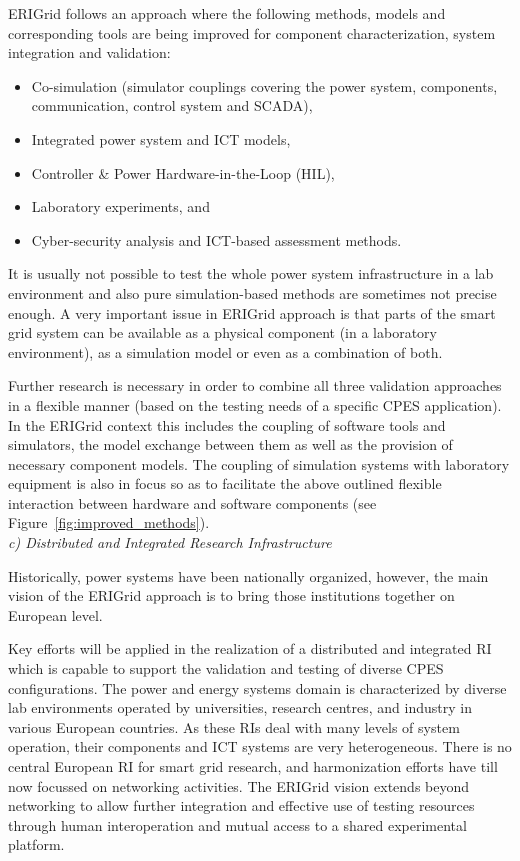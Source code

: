 \documentclass[runningheads,a4paper]{llncs}
\begin{document}
ERIGrid follows an approach where the following methods, models and corresponding tools are being improved for component characterization, system integration and validation:

\begin{itemize}
	\item Co-simulation (simulator couplings covering the power system, components, communication, control system and SCADA),
	\item Integrated power system and ICT models,
	\item Controller \& Power Hardware-in-the-Loop (HIL),
	\item Laboratory experiments, and
	\item Cyber-security analysis and ICT-based assessment methods.
\end{itemize}

It is usually not possible to test the whole power system infrastructure in a lab environment and also pure simulation-based methods are sometimes not precise enough. A very important issue in ERIGrid approach is that parts of the smart grid system can be available as a physical component (in a laboratory environment), as a simulation model or even as a combination of both. 

Further research is necessary in order to combine all three validation approaches in a flexible manner (based on the testing needs of a specific CPES application). In the ERIGrid context this includes the coupling of software tools and simulators, the model exchange between them as well as the provision of necessary component models. The coupling of simulation systems with laboratory equipment is also in focus so as to facilitate the above outlined flexible interaction between hardware and software components (see Figure~\ref{fig:improved_methods}). \\

\noindent\textit{c) Distributed and Integrated Research Infrastructure\\[-0.5em]}

\noindent Historically, power systems have been nationally organized, however, the main vision of the ERIGrid approach is to bring those institutions together on European level. 

Key efforts will be applied in the realization of a distributed and integrated RI which is capable to support the validation and testing of diverse CPES configurations. The power and energy systems domain is characterized by diverse lab environments operated by universities, research centres, and industry in various European countries. As these RIs deal with many levels of system operation, their components and ICT systems are very heterogeneous. There is no central European RI for smart grid research, and harmonization efforts have till now focussed on networking activities. The ERIGrid vision extends beyond networking to allow further integration and effective use of testing resources through human interoperation and mutual access to a shared experimental platform.
\end{document}
